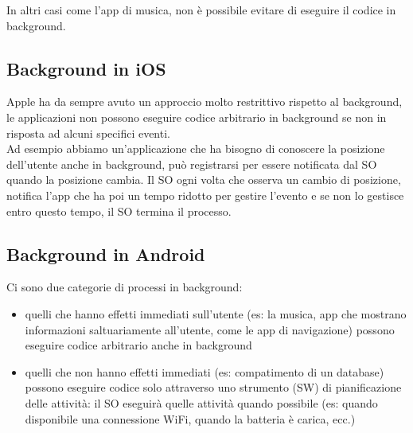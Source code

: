 In altri casi come l'app di musica, non è possibile evitare di eseguire il codice in background. 

\subsection{Background in iOS}
Apple ha da sempre avuto un approccio molto restrittivo rispetto al background, le applicazioni non possono eseguire codice arbitrario in background se non in risposta ad alcuni specifici eventi. 
\\ Ad esempio abbiamo un'applicazione che ha bisogno di conoscere la posizione dell'utente anche in background, può registrarsi per essere notificata dal SO quando la posizione cambia. 
Il SO ogni volta che osserva un cambio di posizione, notifica l'app che ha poi un tempo ridotto per gestire l'evento e se non lo gestisce entro questo tempo, il SO termina il processo. 

\subsection{Background in Android}
Ci sono due categorie di processi in background: 
\begin{itemize}
    \item quelli che hanno effetti immediati sull'utente (es: la musica, app che mostrano informazioni saltuariamente all'utente, come le app di navigazione) possono eseguire codice arbitrario anche in background 
    \item quelli che non hanno effetti immediati (es: compatimento di un database) possono eseguire codice solo attraverso uno strumento (SW) di pianificazione delle attività: il SO eseguirà quelle attività quando possibile (es: quando disponibile una connessione WiFi, quando la batteria è carica, ecc.)
\end{itemize}

